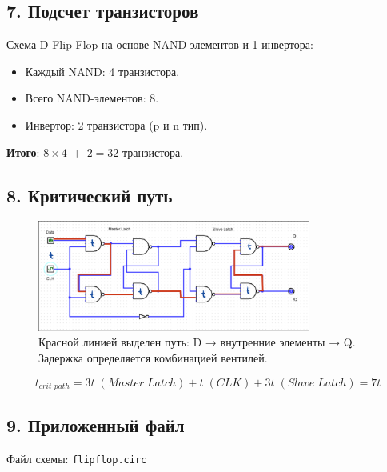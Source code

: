 \documentclass[a4paper,12pt]{article}
\begin{document}
\subsection*{7. Подсчет транзисторов}
Схема D Flip-Flop на основе NAND-элементов и 1 инвертора:
\begin{itemize}
    \item Каждый NAND: 4 транзистора.
    \item Всего NAND-элементов: 8.
    \item Инвертор: 2 транзистора (p и n тип).
\end{itemize}

\textbf{Итого}: \(8 \times 4 \; + \; 2 = 32\) транзистора.

\subsection*{8. Критический путь}
\begin{figure}[h!]
    \centering
    \includegraphics[width=0.8\textwidth]{pictures/crit_path.png}
    \caption{Красной линией выделен путь: D → внутренние элементы → Q. Задержка определяется комбинацией вентилей.}
\end{figure}

$$
    t_{crit\_path} = 3t \; (Master \; Latch) + t \; (CLK) + 3t \; (Slave \; Latch) = 7t
$$

\subsection*{9. Приложенный файл}
Файл схемы: \texttt{flipflop.circ}
\end{document}
